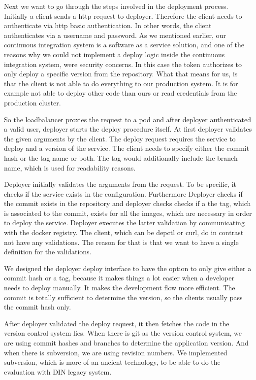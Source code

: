 Next we want to go through the steps involved in the deployment process. Initially a
client sends a http request to deployer. Therefore the client needs to authenticate via
http basic authentication. In other words, the client authenticates via a username and
password. As we mentioned earlier, our continuous integration system is a software as a
service solution, and one of the reasons why we could not implement a deploy logic inside
the continuous integration system, were security concerns. In this case the token
authorizes to only deploy a specific version from the repository. What that means for us,
is that the client is not able to do everything to our production system. It is for
example not able to deploy other code than ours or read credentials from the production
cluster.

So the loadbalancer proxies the request to a pod and after deployer authenticated a valid
user, deployer starts the deploy procedure itself. At first deployer validates the given
arguments by the client. The deploy request requires the service to deploy and a version
of the service. The client needs to specify either the commit hash or the tag name or
both. The tag would additionally include the branch name, which is used for readability
reasons.

Deployer initially validates the arguments from the request. To be specific, it checks if
the service exists in the configuration. Furthermore Deployer checks if the commit exists
in the repository and deployer checks checks if a the tag, which is associated to the
commit, exists for all the images, which are necessary in order to deploy the
service. Deployer executes the latter validation by communicating with the docker
registry. The client, which can be depctl or curl, do in contrast not have any
validations. The reason for that is that we want to have a single definition for the
validations.

We designed the deployer deploy interface to have the option to only give either a commit
hash or a tag, because it makes things a lot easier when a developer needs to deploy
manually. It makes the development flow more efficient. The commit is totally sufficient
to determine the version, so the clients usually pass the commit hash only.

After deployer validated the deploy request, it then fetches the code in the version
control system lies. When there is git as the version control system, we are using commit
hashes and branches to determine the application version. And when there is subversion, we
are using revision numbers. We implemented subversion, which is more of an ancient
technology, to be able to do the evaluation with DIN legacy system.


